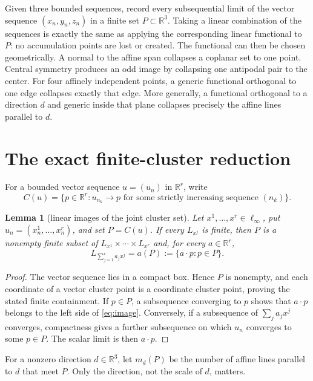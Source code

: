 \documentclass[11pt]{article}
\newtheorem{lemma}{Lemma}
\newcommand{\R}{\mathbb R}
\begin{document}
Given three bounded sequences, record every subsequential limit of the vector
sequence $(x_n,y_n,z_n)$ in a finite set $P\subset\R^3$.  Taking a linear
combination of the sequences is exactly the same as applying the corresponding
linear functional to $P$: no accumulation points are lost or created.  The
functional can then be chosen geometrically.  A normal to the affine span
collapses a coplanar set to one point.  Central symmetry produces an odd image
by collapsing one antipodal pair to the center.  For four affinely independent
points, a generic functional orthogonal to one edge collapses exactly that
edge.  More generally, a functional orthogonal to a direction $d$ and generic
inside that plane collapses precisely the affine lines parallel to $d$.

\section{The exact finite-cluster reduction}

For a bounded vector sequence $u=(u_n)$ in $\R^r$, write
\[
 C(u)=\{p\in\R^r:\text{$u_{n_k}\to p$ for some strictly increasing
 sequence $(n_k)$}\}.
\]

\begin{lemma}[linear images of the joint cluster set]\label{lem:exact}
Let $x^1,\dots,x^r\in\ell_\infty$, put
$u_n=(x^1_n,\dots,x^r_n)$, and set $P=C(u)$.  If every $L_{x^j}$ is finite,
then $P$ is a nonempty finite subset of
$L_{x^1}\times\cdots\times L_{x^r}$ and, for every $a\in\R^r$,
\begin{equation}\label{eq:image}
 L_{\sum_{j=1}^r a_jx^j}=a(P):=\{a\cdot p:p\in P\}.
\end{equation}
\end{lemma}

\begin{proof}
The vector sequence lies in a compact box.  Hence $P$ is nonempty, and each
coordinate of a vector cluster point is a coordinate cluster point, proving
the stated finite containment.  If $p\in P$, a subsequence converging to $p$
shows that $a\cdot p$ belongs to the left side of \eqref{eq:image}.  Conversely,
if a subsequence of $\sum_j a_jx^j$ converges, compactness gives a further
subsequence on which $u_n$ converges to some $p\in P$.  The scalar limit is
then $a\cdot p$.
\end{proof}

For a nonzero direction $d\in\R^3$, let $m_d(P)$ be the number of affine
lines parallel to $d$ that meet $P$.  Only the direction, not the scale of
$d$, matters.
\end{document}
